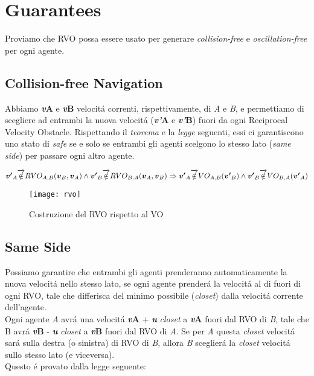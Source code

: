 \section{Guarantees}
Proviamo che RVO possa essere usato per generare \textit{collision-free} e \textit{oscillation-free} per ogni agente.

\subsection{Collision-free Navigation}
Abbiamo {\bfseries\textit{v}\ped A} e {\bfseries\textit{v}\ped B} velocit\'a correnti, rispettivamente, di \textit{A} e \textit{B}, e permettiamo di scegliere ad entrambi la nuova velocit\'a ({\bfseries\textit{v'}\ped A} e {\bfseries\textit{v'}\ped B}) fuori da ogni 
Reciprocal Velocity Obstacle. Rispettando il \textit{teorema} e la \textit{legge} seguenti, essi ci garantiscono uno stato di \textit{safe} se e solo se entrambi gli agenti scelgono lo stesso lato (\textit{same side}) per passare ogni altro agente. 

\begin{teorema}

$\\{\boldsymbol{v'}_ A} \overrightarrow{\notin} RVO_{A,B}({\boldsymbol{v}_ B}, {\boldsymbol{v}_A} ) \wedge {\boldsymbol{v'}_ B} \overrightarrow{\notin} RVO_{B,A}({\boldsymbol{v}_ A}, {\boldsymbol{v}_B} ) \Rightarrow {\boldsymbol{v'}_ A} \overrightarrow{\notin} VO_{A,B}({\boldsymbol{v'}_ B}) \wedge {\boldsymbol{v'}_ B} \overrightarrow{\notin} VO_{B,A}({\boldsymbol{v'}_ A}) $
\end{teorema}

\begin{figure}
\centering 
\texttt{[image: rvo]} 
\caption[Costruzione del RVO rispetto al VO]{Costruzione del RVO rispetto al VO}
\label{fig:rvo} 
\end{figure}


\subsection{Same Side}
Possiamo garantire che entrambi gli agenti prenderanno automaticamente la nuova velocit\'a nello stesso lato, se ogni agente prender\'a la velocit\'a al di fuori di ogni RVO, tale che differisca del minimo possibile (\textit{closet}) dalla velocit\'a corrente dell'agente.
\\Ogni agente \textit{A} avr\'a una velocit\'a {\bfseries\textit{v}\ped A} + {\bfseries\textit{u}} \textit{closet} a {\bfseries\textit{v}\ped A} fuori dal RVO di \textit{B}, tale che B avr\'a {\bfseries\textit{v}\ped B} - {\bfseries\textit{u}} \textit{closet} a {\bfseries\textit{v}\ped B } fuori dal RVO di \textit{A}.
Se per \textit{A} questa \textit{closet} velocit\'a sar\'a sulla destra (o sinistra) di RVO di \textit{B}, allora \textit{B} sceglier\'a la \textit{closet} velocit\'a sullo stesso lato (e viceversa).\\Questo \'e provato dalla legge seguente:

